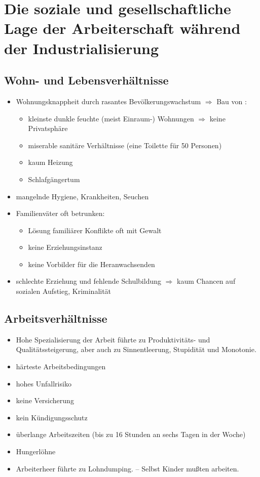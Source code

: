 \section{Die soziale und gesellschaftliche Lage der Arbeiterschaft
während der Industrialisierung}
\label{sec:soz-ges-lag-arb}

\subsection{Wohn- und Lebensverhältnisse}

\begin{itemize}
\item Wohnungsknappheit durch rasantes Bevölkerungswachstum
$\Rightarrow$ Bau von :

\begin{itemize}
\item kleinste dunkle feuchte (meist Einraum-) Wohnungen $\Rightarrow$
keine Privatsphäre
\item miserable sanitäre Verhältnisse (eine Toilette für 50 Personen)
\item kaum Heizung
\item Schlafgängertum
\end{itemize}

\item mangelnde Hygiene, Krankheiten, Seuchen
\item Familienväter oft betrunken:

\begin{itemize}
\item Lösung familiärer Konflikte oft mit Gewalt
\item keine Erziehungsinstanz
\item keine Vorbilder für die Heranwachsenden
\end{itemize}

\item schlechte Erziehung und fehlende Schulbildung $\Rightarrow$ kaum
Chancen auf sozialen Aufstieg, Kriminalität
\end{itemize}

\subsection{Arbeitsverhältnisse}

\begin{itemize}
\item Hohe Spezialisierung der Arbeit führte zu Produktivitäts- und
Qualitätssteigerung, aber auch zu Sinnentleerung, Stupidität und
Monotonie.
\item härteste Arbeitsbedingungen
\item hohes Unfallrisiko
\item keine Versicherung
\item kein Kündigungsschutz
\item überlange Arbeitszeiten (bis zu 16 Stunden an sechs Tagen in der
Woche)
\item Hungerlöhne
\item Arbeiterheer führte zu Lohndumping. -- Selbst Kinder mußten
arbeiten.
\end{itemize}

